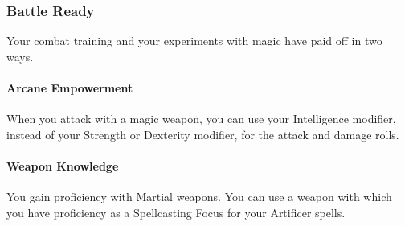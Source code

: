 \documentclass[letterpaper,openany,oneside,twocolumn]{book}
\begin{document}
\subsubsection*{Battle Ready}
Your combat training and your experiments with magic have paid off in two ways.
\paragraph*{Arcane Empowerment} When you attack with a magic weapon, you can use your Intelligence modifier, instead of your Strength or Dexterity modifier, for the attack and damage rolls.
\paragraph*{Weapon Knowledge} You gain proficiency with Martial weapons. You can use a weapon with which you have proficiency as a Spellcasting Focus for your Artificer spells.
\end{document}
